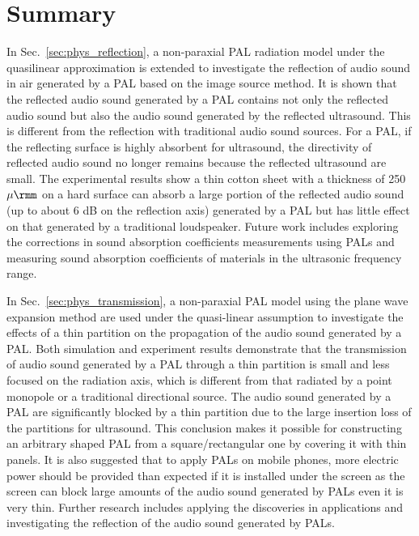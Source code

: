 \section{Summary}

In Sec.~\ref{sec:phys_reflection}, a non-paraxial PAL radiation model under the quasilinear approximation is extended to investigate the reflection of audio sound in air generated by a PAL based on the image source method. 
It is shown that the reflected audio sound generated by a PAL contains not only the reflected audio sound but also the audio sound generated by the reflected ultrasound. 
This is different from the reflection with traditional audio sound sources. 
For a PAL, if the reflecting surface is highly absorbent for ultrasound, the directivity of reflected audio sound no longer {remains} because the reflected ultrasound are small. The experimental results show a thin cotton sheet with a thickness of 250 $\mu\rmm$ on a hard surface can absorb a large portion of the reflected audio sound (up to about 6 dB on the reflection axis) generated by a PAL but has little effect on that generated by a traditional loudspeaker. Future work includes exploring the corrections in sound absorption coefficients measurements using PALs and measuring sound absorption coefficients of materials in the ultrasonic frequency range.


In Sec.~\ref{sec:phys_transmission}, a non-paraxial PAL model using the plane wave expansion method are used under the quasi-linear assumption to investigate the effects of a thin partition on the propagation of the audio sound generated by a PAL. 
Both simulation and experiment results demonstrate that the transmission of audio sound generated by a PAL through a thin partition is small and less focused on the radiation axis, which is different from that radiated by a point monopole or a traditional directional source. The audio sound generated by a PAL are significantly blocked by a thin partition due to the large insertion loss of the partitions for ultrasound. This conclusion makes it possible for constructing an arbitrary shaped PAL from a square/rectangular one by covering it with thin panels. It is also suggested that to apply PALs on mobile phones, more electric power should be provided than expected if it is installed under the screen as the screen can block large amounts of the audio sound generated by PALs even it is very thin. Further research includes applying the discoveries in applications and investigating the reflection of the audio sound generated by PALs.


